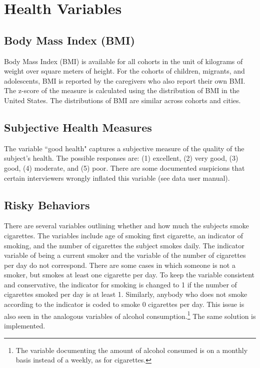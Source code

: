 \section{Health Variables}
\label{sec:health}

\subsection{Body Mass Index (BMI)}
Body Mass Index (BMI) is available for all cohorts in the unit of kilograms of weight over square meters of height. For the cohorts of children, migrants, and adolescents, BMI is reported by the caregivers who also report their own BMI. The z-score of the measure is calculated using the distribution of BMI in the United States. The distributions of BMI are similar across cohorts and cities.

\subsection{Subjective Health Measures}
The variable ``good health" captures a subjective measure of the quality of the subject's health. The possible responses are: (1) excellent, (2) very good, (3) good, (4) moderate, and (5) poor. There are some documented suspicions that certain interviewers wrongly inflated this variable (see data user manual).

\subsection{Risky Behaviors} 

There are several variables outlining whether and how much the subjects smoke cigarettes. The variables include age of smoking first cigarette, an indicator of smoking, and the number of cigarettes the subject smokes daily. The indicator variable of being a current smoker and the variable of the number of cigarettes per day do not correspond. There are some cases in which someone is not a smoker, but smokes at least one cigarette per day. To keep the variable consistent and conservative, the indicator for smoking is changed to 1 if the number of cigarettes smoked per day is at least 1. Similarly, anybody who does not smoke according to the indicator is coded to smoke 0 cigarettes per day. This issue is also seen in the analogous variables of alcohol consumption.\footnote{The variable documenting the amount of alcohol consumed is on a monthly basis instead of a weekly, as for cigarettes.} The same solution is implemented. 


